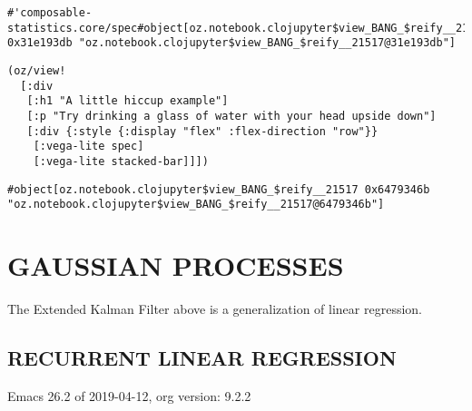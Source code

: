 \documentclass[10pt,oneside,x11names]{article}
\begin{document}
\begin{verbatim}
#'composable-statistics.core/spec#object[oz.notebook.clojupyter$view_BANG_$reify__21517 0x31e193db "oz.notebook.clojupyter$view_BANG_$reify__21517@31e193db"]
\end{verbatim}


\begin{verbatim}
(oz/view!
  [:div
   [:h1 "A little hiccup example"]
   [:p "Try drinking a glass of water with your head upside down"]
   [:div {:style {:display "flex" :flex-direction "row"}}
    [:vega-lite spec]
    [:vega-lite stacked-bar]]])
\end{verbatim}

\begin{verbatim}
#object[oz.notebook.clojupyter$view_BANG_$reify__21517 0x6479346b "oz.notebook.clojupyter$view_BANG_$reify__21517@6479346b"]
\end{verbatim}

\section{GAUSSIAN PROCESSES}
\label{gaussian-processes}
The Extended Kalman Filter above is a generalization of linear
regression.

\subsection{RECURRENT LINEAR REGRESSION}
\label{recurrent-linear-regression}
Emacs 26.2 of 2019-04-12, org version: 9.2.2
\end{document}
